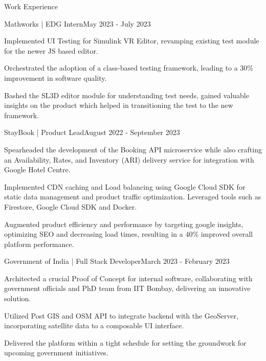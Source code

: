 \documentclass[10pt]{resume}
\begin{document}
    \begin{rSection}{Work Experience}
        \begin{rSubsection}{Mathworks | EDG Intern}{May 2023 - July 2023}
            \item Implemented UI Testing for Simulink VR Editor, revamping existing test module for the newer JS based editor. 
            \item Orchestrated the adoption of a class-based testing framework, leading to a 30\% improvement in software quality. 
            \item Bashed the SL3D editor module for understanding test needs, gained valuable insights on the product which helped in transitioning the test to the new framework.

        \end{rSubsection}
    

        \begin{rSubsection}{StayBook | Product Lead}{August 2022 - September 2023}
            \item Spearheaded the development of the Booking API microservice while also crafting an Availability, Rates, and Inventory (ARI) delivery service for integration with Google Hotel Centre.
            \item Implemented CDN caching and Load balancing using Google Cloud SDK for static data management and product traffic optimization. Leveraged tools such as Firestore, Google Cloud SDK and Docker.
            \item Augmented product efficiency and performance by targeting google insights, optimizing SEO and decreasing load times, resulting in a 40\% improved overall platform performance. 
        \end{rSubsection}

    
        \begin{rSubsection}{Government of India | Full Stack Developer}{March 2023 - February 2023}
            \item Architected a crucial Proof of Concept for internal software, collaborating with government officials and PhD team from IIT Bombay, delivering an innovative solution. 
            \item Utilized Post GIS and OSM API to integrate backend with the GeoServer, incorporating satellite data to a composable UI interface.
            \item Delivered the platform within a tight schedule for setting the groundwork for upcoming government initiatives. 
        \end{rSubsection}
    

\end{rSection}
\end{document}
